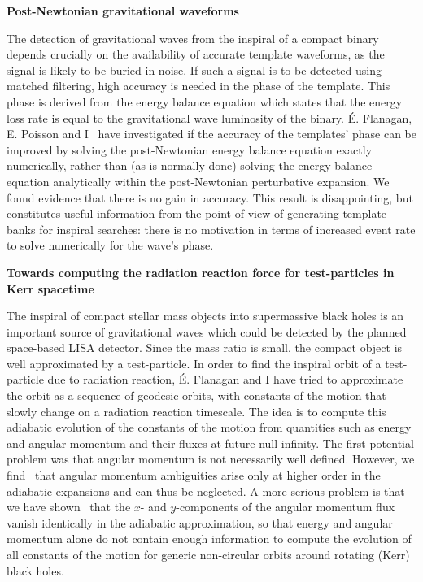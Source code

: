 \documentclass[11pt]{article}
\begin{document}
\begin{spacing}{0.95}
\medskip %
\noindent
{\bf Post-Newtonian gravitational waveforms }
\smallskip

The detection of gravitational waves from the inspiral of a compact binary
depends crucially on the availability of accurate template waveforms, as the
signal is likely to be buried in noise. If such a signal is to be detected
using matched filtering, high accuracy is needed in the phase of the
template. This phase is derived from the energy balance equation which
states that the energy loss rate is equal to the gravitational wave
luminosity of the binary. 
\'E. Flanagan, E. Poisson and I~\cite{Tichy:1999pv} have investigated
if the accuracy of the templates' phase can be improved by solving the
post-Newtonian energy balance equation exactly numerically, rather than (as
is normally done) solving the energy balance equation analytically within
the post-Newtonian perturbative expansion. We found evidence that there is
no gain in accuracy. This result is disappointing, but constitutes useful
information from the point of view of generating template banks for inspiral
searches: there is no motivation in terms of increased event rate to solve
numerically for the wave's phase.




\medskip %
\noindent
{\bf Towards computing the radiation reaction force
        for test-particles in Kerr spacetime}
\smallskip

The inspiral of compact stellar mass objects into supermassive black holes
is an important source of gravitational waves which could be detected by the
planned space-based LISA detector. Since the mass ratio is small, the
compact object is well approximated by a test-particle. In order to find the
inspiral orbit of a test-particle due to radiation reaction, \'E. Flanagan
and I have tried to approximate the orbit as a sequence of geodesic orbits,
with constants of the motion that slowly change on a radiation reaction
timescale. The idea is to compute this adiabatic evolution of the constants
of the motion from quantities such as energy and angular momentum and their
fluxes at future null infinity. The first potential problem was that angular
momentum is not necessarily well defined. However, we find~\cite{Tichy00b}
that angular momentum ambiguities arise only at higher order in the
adiabatic expansions and can thus be neglected. A more serious problem is
that we have shown~\cite{Tichy00b} that the $x$- and
$y$-components of the angular momentum flux vanish identically in the
adiabatic approximation, so that energy and angular momentum alone do
not contain enough information to compute the evolution of all constants of
the motion for generic non-circular orbits around rotating (Kerr) 
black holes.






\end{spacing}
\end{document}
